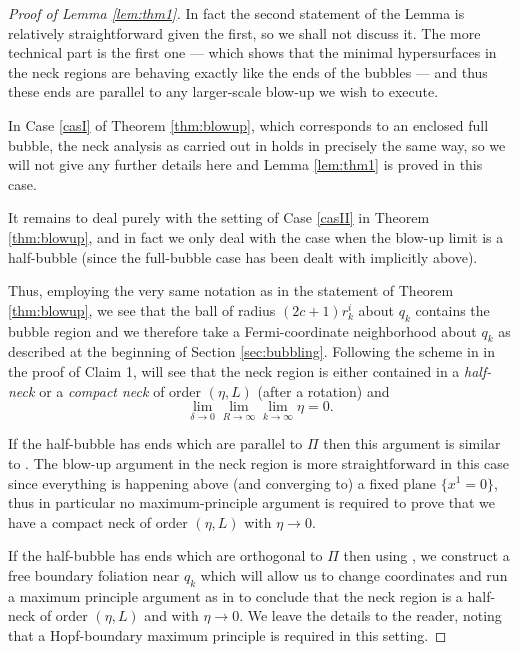 \documentclass[10pt]{amsart}
\newcounter{cas}
\theoremstyle{definition}
\begin{document}
\begin{proof}[Proof of Lemma \ref{lem:thm1}]
In fact the second statement of the Lemma is relatively straightforward given the first, so we shall not discuss it. The more technical part is the first one --- which shows that the minimal hypersurfaces in the neck regions are behaving exactly like the ends of the bubbles --- and thus these ends are parallel to any larger-scale blow-up we wish to execute.

In Case \ref{casI} of Theorem \ref{thm:blowup}, which corresponds to an enclosed full bubble, the neck analysis as carried out in \cite[\S4]{BS17} holds in precisely the same way, so we will not give any further details here and Lemma \ref{lem:thm1} is proved in this case.

It remains to deal purely with the setting of Case \ref{casII} in Theorem \ref{thm:blowup}, and in fact we only deal with the case when the blow-up limit is a half-bubble (since the full-bubble case has been dealt with implicitly above).

Thus, employing the very same notation as in the statement of Theorem \ref{thm:blowup}, we see that the ball of radius $(2c+1)r^i_k$ about $q_k$ contains the bubble region and we therefore take a Fermi-coordinate neighborhood about $q_k$ as described at the beginning of Section \ref{sec:bubbling}. Following the scheme in \cite[p.\,4390]{BS17} in the proof of Claim 1, will see that the neck region is either contained in a \emph{half-neck} or a \emph{compact neck} of order $(\eta, L)$ (after a rotation) and
\[
\lim_{\delta\to 0}\lim_{R\to \infty}\lim_{k\to \infty} \eta = 0.
\]

If the half-bubble has ends which are parallel to $\Pi$ then this argument is similar to \cite[\S4]{BS17}. The blow-up argument in the neck region is more straightforward in this case since everything is happening above (and converging to) a fixed plane $\{x^1 = 0\}$, thus in particular no maximum-principle argument is required to prove that we have a compact neck of order $(\eta, L)$ with $\eta\to 0$.

If the half-bubble has ends which are orthogonal to $\Pi$ then using \cite[\S3]{ACS17}, we construct a free boundary foliation near $q_k$ which will allow us to change coordinates and run a maximum principle argument as in \cite[p.\,4391]{BS17} to conclude that the neck region is a half-neck of order $(\eta ,L)$ and with $\eta \to 0$. We leave the details to the reader, noting that a Hopf-boundary maximum principle is required in this setting.
\end{proof}
\end{document}
